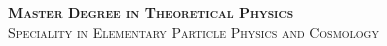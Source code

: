 \documentclass[
12pt, %
oneside, %
english, %
singlespacing, %
headsepline, %
consistentlayout, %
]{MastersDoctoralThesis} %
\begin{document}
\begin{titlepage}
\begin{center}
\vfill

{\scshape \textbf{Master Degree in Theoretical Physics}}\\
{\scshape Speciality in Elementary Particle Physics and Cosmology}\\%

 

\end{center}
\end{titlepage}



\begin{abstract}
\addchaptertocentry{\abstractname} %

\end{abstract}


\begin{acknowledgements}
\addchaptertocentry{\acknowledgementname} %

\end{acknowledgements}


\tableofcontents %



\end{document}

